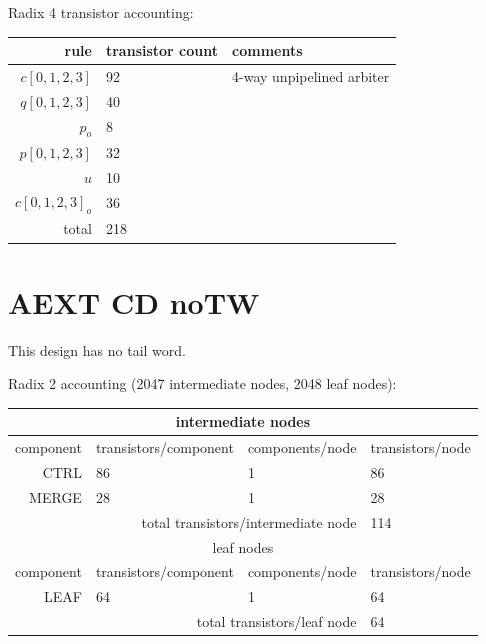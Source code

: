 \documentclass{article}
\begin{document}
\noindent
Radix 4 transistor accounting:

\begin{center}
    \begin{tabular}{|r|l|l|}
    \hline
    rule & transistor count & comments \\ \hline
    $c[0,1,2,3]$ & 92 & 4-way unpipelined arbiter \\ \hline
    $q[0,1,2,3]$ & 40 & \\ \hline
    $p_o$ & 8 & \\ \hline
    $p[0,1,2,3]$ & 32 & \\ \hline
    $u$ & 10 & \\ \hline
    $c[0,1,2,3]_o$ & 36 & \\ \hline
    \hline total & 218 & \\ \hline
    \end{tabular}
\end{center}

\section{AEXT CD noTW \label{sec:AEXT_CD_noTW}}

This design has no tail word.

\noindent
Radix 2 accounting (2047 intermediate nodes, 2048 leaf nodes):

\begin{center}
    \begin{tabular}{|r|l|l|l|}
    \hline \multicolumn{4}{|c|}{intermediate nodes} \\ \hline
    component & transistors/component & components/node & transistors/node \\ \hline
    CTRL & 86 & 1 & 86 \\ \hline
    MERGE & 28 & 1 & 28 \\ \hline
    \hline \multicolumn{3}{|r|}{total transistors/intermediate node} & 114 \\ \hline
    \hline \multicolumn{4}{|c|}{leaf nodes} \\ \hline
    component & transistors/component & components/node & transistors/node \\ \hline
    LEAF & 64 & 1 & 64 \\ \hline
    \hline \multicolumn{3}{|r|}{total transistors/leaf node} & 64 \\ \hline
    \end{tabular}
\end{center}
\end{document}
